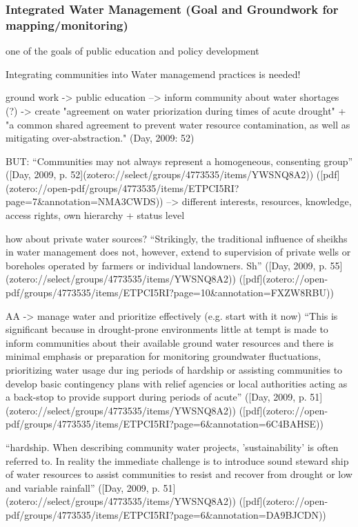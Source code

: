 





\subsubsection{Integrated Water Management (Goal and Groundwork for mapping/monitoring)}


one of the goals of public education and policy development

Integrating communities into Water managemend practices is needed!

ground work -> public education --> inform community about water shortages (?) -> create "agreement on water priorization during times of acute drought" + "a common shared agreement to prevent water resource contamination, as well as mitigating over-abstraction." (Day, 2009: 52)

BUT:
“Communities may not always represent a homogeneous, consenting group” ([Day, 2009, p. 52](zotero://select/groups/4773535/items/YWSNQ8A2)) ([pdf](zotero://open-pdf/groups/4773535/items/ETPCI5RI?page=7&annotation=NMA3CWDS))
--> different interests, resources, knowledge, access rights, own hierarchy + status level

how about private water sources?
“Strikingly, the traditional influence of sheikhs in water management does not, however, extend to supervision of private wells or boreholes operated by farmers or individual landowners. Sh” ([Day, 2009, p. 55](zotero://select/groups/4773535/items/YWSNQ8A2)) ([pdf](zotero://open-pdf/groups/4773535/items/ETPCI5RI?page=10&annotation=FXZW8RBU))

AA -> manage water and prioritize effectively (e.g. start with it now)
“This is significant because in drought-prone environments little at tempt is made to inform communities about their available ground water resources and there is minimal emphasis or preparation for monitoring groundwater fluctuations, prioritizing water usage dur ing periods of hardship or assisting communities to develop basic contingency plans with relief agencies or local authorities acting as a back-stop to provide support during periods of acute” ([Day, 2009, p. 51](zotero://select/groups/4773535/items/YWSNQ8A2)) ([pdf](zotero://open-pdf/groups/4773535/items/ETPCI5RI?page=6&annotation=6C4BAHSE))

“hardship. When describing community water projects, 'sustainability' is often referred to. In reality the immediate challenge is to introduce sound steward ship of water resources to assist communities to resist and recover from drought or low and variable rainfall” ([Day, 2009, p. 51](zotero://select/groups/4773535/items/YWSNQ8A2)) ([pdf](zotero://open-pdf/groups/4773535/items/ETPCI5RI?page=6&annotation=DA9BJCDN))


